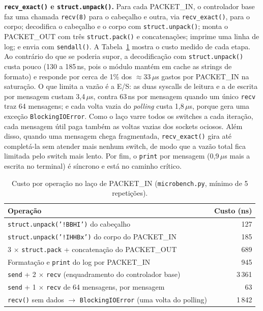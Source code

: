 \documentclass[12pt]{article}
\begin{document}
\textbf{\texttt{recv\_exact()} e \texttt{struct.unpack()}.} Para cada PACKET\_IN, o
controlador base faz uma chamada \texttt{recv(8)} para o cabeçalho e outra, via
\texttt{recv\_exact()}, para o corpo; decodifica o cabeçalho e o corpo com
\texttt{struct.unpack()}; monta o PACKET\_OUT com três \texttt{struct.pack()} e
concatenações; imprime uma linha de log; e envia com \texttt{sendall()}. A
Tabela~\ref{tab:micro} mostra o custo medido de cada etapa. Ao contrário do que se
poderia supor, a decodificação com \texttt{struct.unpack()} custa pouco (130 a 185\,ns,
pois o módulo mantém em cache as strings de formato) e responde por cerca de 1\% dos
$\approx$33\,$\mu$s gastos por PACKET\_IN na saturação. O que limita a vazão é a E/S: as
duas syscalls de leitura e a de escrita por mensagem custam 3,4\,$\mu$s, contra
63\,ns por mensagem quando um único \texttt{recv} traz 64 mensagens; e cada volta vazia
do \textit{polling} custa 1,8\,$\mu$s, porque gera uma exceção \texttt{BlockingIOError}.
Como o laço varre todos os switches a cada iteração, cada mensagem útil paga também as
voltas vazias dos sockets ociosos. Além disso, quando uma mensagem chega fragmentada,
\texttt{recv\_exact()} gira até completá-la sem atender mais nenhum switch, de modo que
a vazão total fica limitada pelo switch mais lento. Por fim, o \texttt{print} por mensagem
(0,9\,$\mu$s mais a escrita no terminal) é síncrono e está no caminho crítico.

\begin{table}[!htb]
\centering
\caption{Custo por operação no laço de PACKET\_IN (\texttt{microbench.py}, mínimo de 5 repetições).}
\label{tab:micro}
\small
\begin{tabular}{@{}lr@{}}
\toprule
Operação & Custo (ns) \\
\midrule
\texttt{struct.unpack('!BBHI')} do cabeçalho & 127 \\
\texttt{struct.unpack('!IHHBx')} do corpo do PACKET\_IN & 185 \\
3 $\times$ \texttt{struct.pack} + concatenação do PACKET\_OUT & 689 \\
Formatação e \texttt{print} do log por PACKET\_IN & 945 \\
\texttt{send} + 2 $\times$ \texttt{recv} (enquadramento do controlador base) & 3\,361 \\
\texttt{send} + 1 $\times$ \texttt{recv} de 64 mensagens, por mensagem & 63 \\
\texttt{recv()} sem dados $\rightarrow$ \texttt{BlockingIOError} (uma volta do polling) & 1\,842 \\
\bottomrule
\end{tabular}
\end{table}
\end{document}
